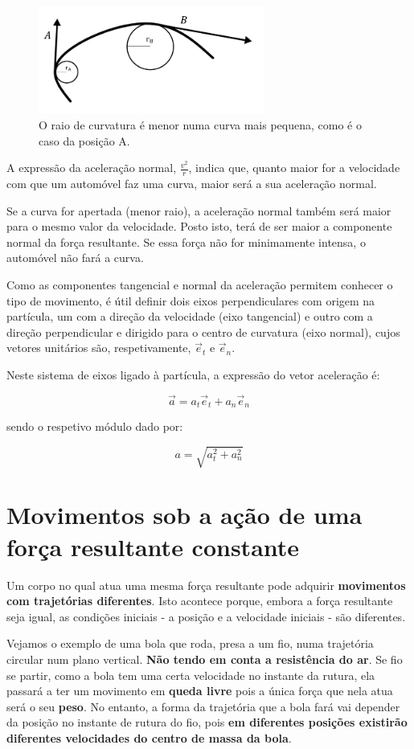 \documentclass[a4paper,11pt,oneside]{report}
\begin{document}
\begin{figure}[H]
    \center
    \includegraphics[height=100pt]{figuras/rdc.png}
    \caption{O raio de curvatura é menor numa curva mais pequena, como é o caso da posição A.}
    \label{fig:corpo9}
\end{figure}

A expressão da aceleração normal, $\frac{v^2}{r}$, indica que, quanto maior 
for a velocidade com que um automóvel faz uma curva, maior será a sua aceleração
normal.

Se a curva for apertada (menor raio), a aceleração normal também será maior 
para o mesmo valor da velocidade. Posto isto, terá de ser maior a componente 
normal da força resultante. Se essa força não for minimamente intensa, o automóvel 
não fará a curva.

Como as componentes tangencial e normal da aceleração permitem conhecer o tipo de 
movimento, é útil definir dois eixos perpendiculares com origem na partícula, um 
com a direção da velocidade (eixo tangencial) e outro com a direção perpendicular 
e dirigido para o centro de curvatura (eixo normal), cujos vetores unitários são, 
respetivamente, $\vec e_t$ e $\vec e_n$.

Neste sistema de eixos ligado à partícula, a expressão do vetor aceleração é:

\[
\vec a = a_t\vec e_t + a_n\vec e_n
\]

\noindent sendo o respetivo módulo dado por: 

\[
a = \sqrt{a_{t}^{2}+a_{n}^{2}}
\]

\chapter{Movimentos sob a ação de uma força resultante constante}
\label{chap.movimentos}

Um corpo no qual atua uma mesma força resultante pode adquirir \textbf{movimentos 
com trajetórias diferentes}. Isto acontece porque, embora a força resultante 
seja igual, as condições iniciais - a posição e a velocidade iniciais - 
são diferentes.

Vejamos o exemplo de uma bola que roda, presa a um fio, numa trajetória 
circular num plano vertical. \textbf{Não tendo em conta a resistência do ar}. 
Se fio se partir, como a bola tem uma certa velocidade no instante da rutura, 
ela passará a ter um movimento em \textbf{queda livre} pois a única força que nela 
atua será o seu \textbf{peso}. No entanto, a forma da trajetória que a bola fará vai 
depender da posição no instante de rutura do fio, pois \textbf{em diferentes posições 
existirão diferentes velocidades do centro de massa da bola}.
\end{document}
